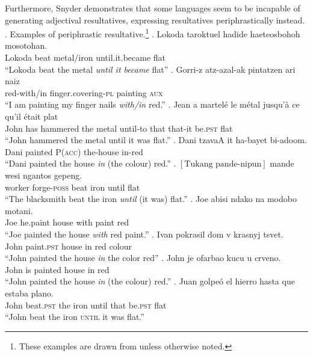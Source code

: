 \documentclass[MilwayThesis]{subfiles}
\begin{document}
Furthermore, Snyder demonstrates that some languages seem to be incapable of generating adjectival resultatives, expressing resultatives periphrastically instead.
\ex. Examples of periphrastic resultative.\footnote{These examples are drawn from \textcite{snyder2001nature} unless otherwise noted.}
\ag. Lokoda taroktuel hadide haete\textglotstop{}osbohoh mosoto\textglotstop{}han.\\
Lokoda beat metal/iron until.it.became flat\\
``Lokoda beat the metal \textit{until it became} flat''
\bg. Gorri-z atz-azal-ak pintatzen ari naiz\\
red-with/in finger.covering-\textsc{pl} painting \textsc{aux}\\
``I am painting my finger nails \textit{with/in} red.''
\bg. Jean a martel\'{e} le m\'{e}tal jusqu'\`{a} ce qu'il \'{e}tait plat\\
John has hammered the metal until-to that that-it be.\textsc{pst} flat\\
``John hammered the metal until it was flat.''
\bg. Dani tzavaA \textglotstop{}it ha-bayet bi-\textglotstop{}adoom.\\
Dani painted P(\textsc{acc}) the-house in-red\\
``Dani painted the house \textit{in} (the colour) red.''
\bg. $\left[\text{Tukang pande-nipun}\right]$ mande wesi ngantos gepeng.\\
{worker forge-\textsc{poss}} beat iron until flat\\
``The blacksmith beat the iron \textit{until} (it was) flat.''
\bg. Joe abisi ndako na modobo motani.\\
Joe he.paint house with paint red\\
``Joe painted the house \textit{with} red paint.''
\bg. Ivan pokrasil dom v krasnyj tsvet.\\
John paint.\textsc{pst} house in red colour\\
``John painted the house \textit{in} the color red''
\bg. John je ofarbao kucu u crveno.\\
John is painted house in red\\
``John painted the house \textit{in} (the colour) red.''
\bg. Juan golpe\'{o} el hierro hasta que estaba plano.\\
John beat.\textsc{pst} the iron until that be.\textsc{pst} flat\\
``John beat the iron \textsc{until} it was flat.''
\end{document}
